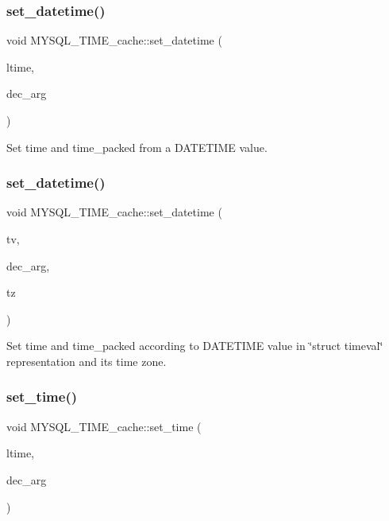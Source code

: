 \subsubsection{\texorpdfstring{set\+\_\+datetime()}{set\_datetime()}\hspace{0.1cm}{\footnotesize\ttfamily [1/2]}}
{\footnotesize\ttfamily void M\+Y\+S\+Q\+L\+\_\+\+T\+I\+M\+E\+\_\+cache\+::set\+\_\+datetime (\begin{DoxyParamCaption}\item[{M\+Y\+S\+Q\+L\+\_\+\+T\+I\+ME $\ast$}]{ltime,  }\item[{uint8}]{dec\+\_\+arg }\end{DoxyParamCaption})}

Set time and time\+\_\+packed from a D\+A\+T\+E\+T\+I\+ME value. \mbox{\label{classMYSQL__TIME__cache_a3121a1ec215a490a07f49f9adae7dc3b}} 
\subsubsection{\texorpdfstring{set\+\_\+datetime()}{set\_datetime()}\hspace{0.1cm}{\footnotesize\ttfamily [2/2]}}
{\footnotesize\ttfamily void M\+Y\+S\+Q\+L\+\_\+\+T\+I\+M\+E\+\_\+cache\+::set\+\_\+datetime (\begin{DoxyParamCaption}\item[{struct timeval}]{tv,  }\item[{uint8}]{dec\+\_\+arg,  }\item[{\mbox{\hyperlink{classTime__zone}{Time\+\_\+zone}} $\ast$}]{tz }\end{DoxyParamCaption})}

Set time and time\+\_\+packed according to D\+A\+T\+E\+T\+I\+ME value in \char`\"{}struct timeval\char`\"{} representation and its time zone. \mbox{\label{classMYSQL__TIME__cache_a075e291a39c3869e990f69c88e333e1e}} 
\subsubsection{\texorpdfstring{set\+\_\+time()}{set\_time()}\hspace{0.1cm}{\footnotesize\ttfamily [1/2]}}
{\footnotesize\ttfamily void M\+Y\+S\+Q\+L\+\_\+\+T\+I\+M\+E\+\_\+cache\+::set\+\_\+time (\begin{DoxyParamCaption}\item[{M\+Y\+S\+Q\+L\+\_\+\+T\+I\+ME $\ast$}]{ltime,  }\item[{uint8}]{dec\+\_\+arg }\end{DoxyParamCaption})}

